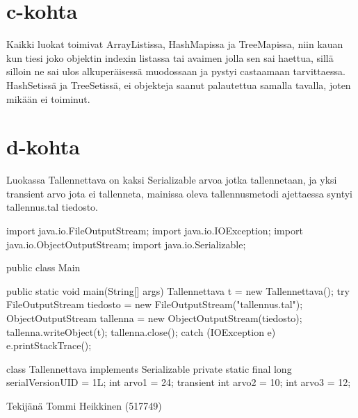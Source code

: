 \section{c-kohta}
\label{c-kohta}
Kaikki luokat toimivat ArrayListissa, HashMapissa ja TreeMapissa, niin kauan kun tiesi
joko objektin indexin listassa tai avaimen jolla sen sai haettua, sillä silloin ne sai
ulos alkuperäisessä muodossaan ja pystyi castaamaan tarvittaessa. HashSetissä ja
TreeSetissä, ei objekteja saanut palautettua samalla tavalla, joten mikään ei toiminut.

\section{d-kohta}
\label{d-kohta}
Luokassa Tallennettava on kaksi Serializable arvoa jotka tallennetaan, ja yksi transient
arvo jota ei tallenneta, mainissa oleva tallennusmetodi ajettaessa syntyi tallennus.tal
tiedosto.
\begin{javacode}
import java.io.FileOutputStream;
import java.io.IOException;
import java.io.ObjectOutputStream;
import java.io.Serializable;

public class Main {
  public static void main(String[] args) {
    Tallennettava t = new Tallennettava();
    try {
      FileOutputStream tiedosto = new FileOutputStream("tallennus.tal");
      ObjectOutputStream tallenna = new ObjectOutputStream(tiedosto);
      tallenna.writeObject(t);
      tallenna.close();
    } catch (IOException e) {
      e.printStackTrace();
    }
  }
  
}
class Tallennettava implements Serializable{
  private static final long serialVersionUID = 1L;
  int arvo1 = 24;
  transient int arvo2 = 10;
  int arvo3 = 12;
}
\end{javacode}


Tekijänä Tommi Heikkinen (517749)

